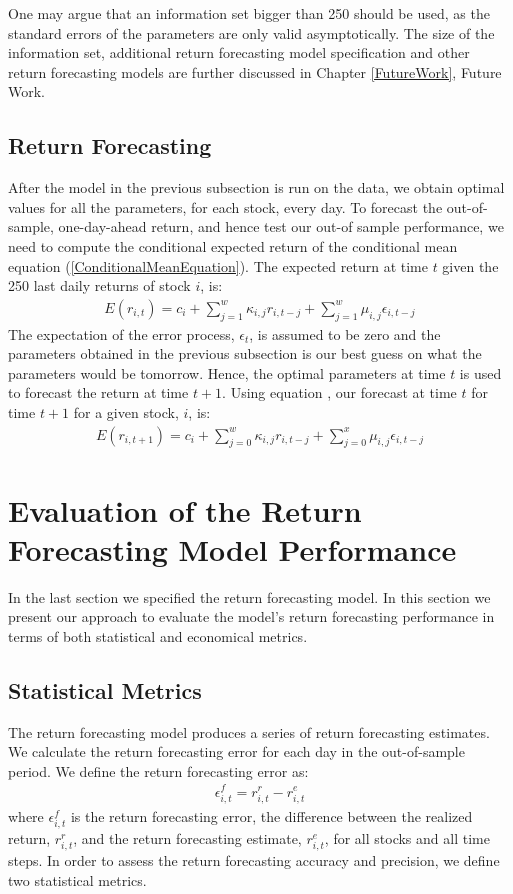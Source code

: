 One may argue that an information set bigger than 250 should be used, as the standard errors of the parameters are only valid asymptotically. The size of the information set, additional return forecasting model specification and other return forecasting models are further discussed in Chapter \ref{FutureWork}, Future Work.


\subsection{Return Forecasting}

After the model in the previous subsection is run on the data, we obtain optimal values for all the parameters, for each stock, every day. To forecast the out-of-sample, one-day-ahead return, and hence test our out-of sample performance, we need to compute the conditional expected return of the conditional mean equation (\ref{ConditionalMeanEquation}). The expected return at time $t$ given the 250 last daily returns of stock $i$, is:
\begin{align} 
    E(r_{i,t})=c_i+\sum_{j=1}^w\kappa_{i,j} r_{i,t-j}+\sum_{j=1}^w\mu_{i,j} \epsilon_{i,t-j} \label{ExpectedConditionalMean}
\end{align}
The expectation of the error process, $\epsilon_t$, is assumed to be zero and the parameters obtained in the previous subsection is our best guess on what the parameters would be tomorrow. Hence, the optimal parameters at time $t$ is used to forecast the return at time $t+1$. Using equation \label{ExpectedConditionalMean}, our forecast at time $t$ for time $t+1$ for a given stock, $i$, is:
\begin{align} 
    E(r_{i,t+1})=c_i+\sum_{j=0}^w\kappa_{i,j} r_{i,t-j}+\sum_{j=0}^x\mu_{i,j} \epsilon_{i,t-j}
\end{align}

\section{Evaluation of the Return Forecasting Model Performance}
In the last section we specified the return forecasting model. In this section we present our approach to evaluate the model's return forecasting performance in terms of both statistical and economical metrics. 

\subsection{Statistical Metrics}
The return forecasting model produces a series of return forecasting estimates. We calculate the return forecasting error for each day in the out-of-sample period. We define the return forecasting error as:
\begin{align}
    \epsilon_{i,t}^{f} = r_{i,t}^{r} - r_{i,t}^{e}
\end{align}
where $\epsilon_{i,t}^{f}$ is the return forecasting error, the difference between the realized return, $r_{i,t}^{r}$, and the return forecasting estimate, $r_{i,t}^{e}$, for all stocks and all time steps. In order to assess the return forecasting accuracy and precision, we define two statistical metrics. 

